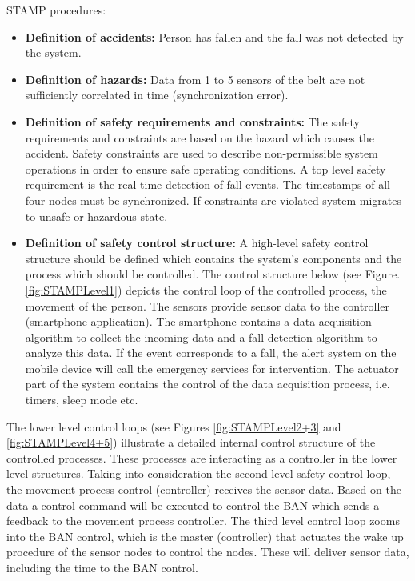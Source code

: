 \documentclass[10pt,journal,compsoc]{IEEEtran}
\begin{document}
STAMP procedures:

\begin{itemize}
	\item \textbf{Definition of accidents:} Person has fallen and the fall was not detected by the system.
	\item \textbf{Definition of hazards:} Data from 1 to 5 sensors of the belt are not sufficiently correlated in time (synchronization error).
	\item \textbf{Definition of safety requirements and constraints:} The safety requirements and constraints are based on the hazard which causes the accident. Safety constraints are used to describe non-permissible system operations in order to ensure safe operating conditions. A top level safety requirement is the real-time detection of fall events. The timestamps of all four nodes must be synchronized. If constraints are violated system migrates to unsafe or hazardous state.
	\item \textbf{Definition of safety control structure:}
	A high-level safety control structure should be defined which contains the system's components and the process which should be controlled. The control structure below (see Figure. \ref{fig:STAMPLevel1}) depicts the control loop of the controlled process, the movement of the person.
	The sensors provide sensor data to the controller (smartphone application). The smartphone contains a data acquisition algorithm to collect the incoming data and a fall detection algorithm to analyze this data. If the event corresponds to a fall, the alert system on the mobile device will call the emergency services for intervention. The actuator part of the system contains the control of the data acquisition process, i.e. timers, sleep mode etc.
\end{itemize}	
	The lower level control loops (see Figures \ref{fig:STAMPLevel2+3} and \ref{fig:STAMPLevel4+5}) illustrate a detailed internal control structure of the controlled processes. These processes are interacting as a controller in the lower level structures. Taking into consideration the second level safety control loop, the movement process control (controller) receives the sensor data. Based on the data a control command will be executed to control the BAN which sends a feedback to the movement process controller. The third level control loop zooms into the BAN control, which is the master (controller) that actuates the wake up procedure of the sensor nodes to control the nodes. These will deliver sensor data, including the time to the BAN control.
\end{document}
